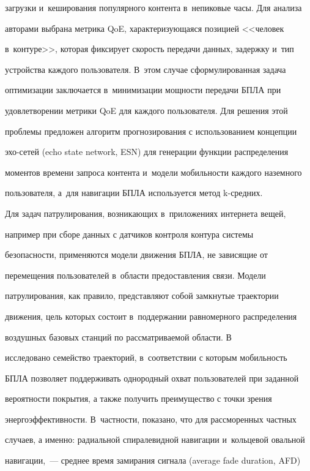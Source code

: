 загрузки и~кеширования популярного контента в~непиковые часы. Для анализа 


авторами выбрана метрика QoE, характеризующаяся позицией <<человек 


в~контуре>>, которая фиксирует скорость передачи данных, задержку и~тип 


устройства каждого пользователя. В~этом случае сформулированная задача 


оптимизации заключается в~минимизации мощности передачи БПЛА при 


удовлетворении метрики QoE для каждого пользователя. Для решения этой 


проблемы предложен алгоритм прогнозирования с использованием концепции 


эхо-сетей (echo state network, ESN) для генерации функции распределения 


моментов времени запроса контента и~модели мобильности каждого наземного 


пользователя, а~для навигации БПЛА используется метод k-сред\-них.


  


  Для задач патрулирования, возникающих в~приложениях интернета вещей, 


например при сборе данных с датчиков контроля контура системы 


безопасности, применяются модели движения БПЛА, не зависящие от 


перемещения пользователей в~области предоставления связи. Модели 


патрулирования, как правило, представляют собой замкнутые траектории 


движения, цель которых состоит в~поддержании равномерного распределения 


воздушных базовых станций по рассматриваемой области. В~\cite{17-md} 


исследовано семейство траекторий, в~соответствии с которым мобильность 


БПЛА позволяет поддерживать однородный охват пользователей при заданной 


вероятности покрытия, а также получить преимущество с точки зрения 


энергоэффективности. В~част\-ности, показано, что для рассморенных частных 


случаев, а именно: радиальной спиралевидной навигации и~кольцевой овальной 


навигации,~--- среднее время замирания сигнала (average fade duration, AFD) 


